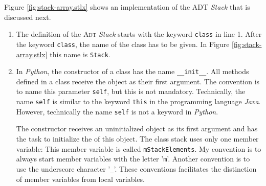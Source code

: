 Figure \ref{fig:stack-array.stlx} shows an implementation of the ADT \textsl{Stack} that is 
discussed next.
\begin{enumerate}
\item The definition of the \textsc{Adt} \textsl{Stack} starts with the keyword \texttt{class}
      in line 1.
      After the keyword \texttt{class}, the name of the class has to be given.  In Figure
      \ref{fig:stack-array.stlx} this name is \texttt{Stack}.
\item In \textsl{Python}, the constructor of a class has the name \texttt{\_\_init\_\_}.
      All methods defined in a class receive the object as their first argument.
      The convention is to name this parameter \texttt{self}, but this is not mandatory.
      Technically, the name \texttt{self} is similar to the keyword \texttt{this} in the programming language
      \textsl{Java}.  However, technically the name \texttt{self} is not a keyword in \textsl{Python}.
      
      The constructor receives an uninitialized object as its first argument and has the task
      to initialize the  of this object.  The class stack uses only one member variable:
      This member variable is called \texttt{mStackElements}.  My convention is to always start member
      variables with the letter '\texttt{m}'.  Another convention is to use the underscore character
      '\texttt{\_}'.  These conventions facilitates the distinction of member variables from local variables.


\end{enumerate}
